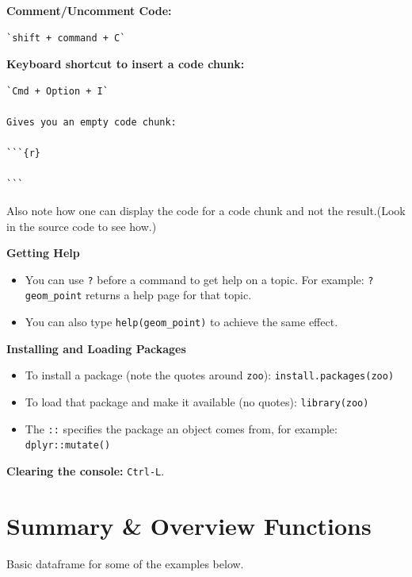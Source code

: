 \documentclass[
]{book}
\begin{document}
\textbf{Comment/Uncomment Code:}

\begin{verbatim}
`shift + command + C`
\end{verbatim}

\textbf{Keyboard shortcut to insert a code chunk:}

\begin{verbatim}
`Cmd + Option + I`

Gives you an empty code chunk:

```{r}

```
\end{verbatim}

Also note how one can display the code for a code chunk and not the result.(Look in the source code to see how.)

\textbf{Getting Help}

\begin{itemize}
\item
  You can use \texttt{?} before a command to get help on a topic. For example:
  \texttt{?geom\_point} returns a help page for that topic.
\item
  You can also type \texttt{help(geom\_point)} to achieve the same effect.
\end{itemize}

\textbf{Installing and Loading Packages}

\begin{itemize}
\item
  To install a package (note the quotes around \texttt{zoo}): \texttt{install.packages(\textquotesingle{}zoo\textquotesingle{})}
\item
  To load that package and make it available (no quotes): \texttt{library(zoo)}
\item
  The \texttt{::} specifies the package an object comes from, for example: \texttt{dplyr::mutate()}
\end{itemize}

\textbf{Clearing the console:} \texttt{Ctrl-L}.

\hypertarget{intro}{%
\chapter{Summary \& Overview Functions}\label{intro}}

Basic dataframe for some of the examples below.
\end{document}
